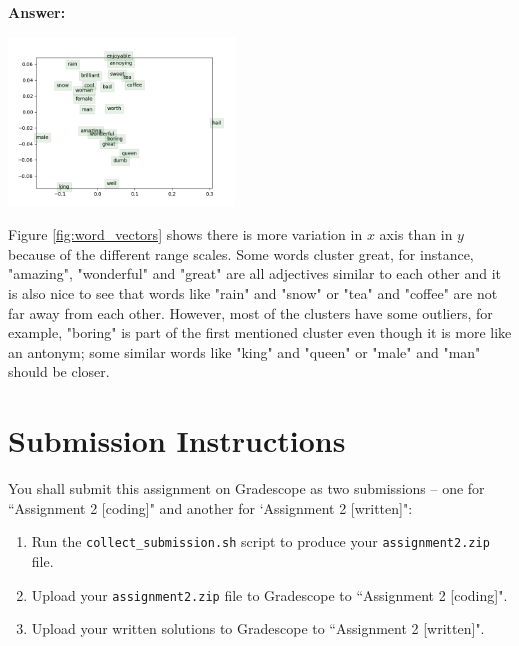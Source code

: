 \documentclass{article}
\newenvironment{answer}{
    {\bf Answer:} \sf \begingroup\color{red}
}{\endgroup}%
\begin{document}
\begin{enumerate}[label=(\alph*)]
\begin{shaded}
\begin{answer}

\begin{minipage}[h]{\linewidth}
    \begin{center}
   \vspace{-2ex}
   \includegraphics[width=0.45\textwidth]{word_vectors.png}
   \label{fig:word_vectors}
   \end{center}
\end{minipage} \color{red} {Figure \ref{fig:word_vectors} shows there is more variation in $x$ axis than in $y$ because of the different range scales. Some words cluster great, for instance, "amazing", "wonderful" and "great" are all adjectives similar to each other and it is also nice to see that words like "rain" and "snow" or "tea" and "coffee" are not far away from each other. However, most of the clusters have some outliers, for example, "boring" is part of the first mentioned cluster even though it is more like an antonym; some similar words like "king" and "queen" or "male" and "man" should be closer.}

\end{answer}
\end{shaded}

\section{Submission Instructions}
You shall submit this assignment on Gradescope as two submissions -- one for ``Assignment 2 [coding]" and another for `Assignment 2 [written]":
\begin{enumerate}
    \item Run the \texttt{collect\_submission.sh} script to produce your \texttt{assignment2.zip} file.
    \item Upload your \texttt{assignment2.zip} file to Gradescope to ``Assignment 2 [coding]".
    \item Upload your written solutions to Gradescope to ``Assignment 2 [written]".
\end{enumerate}

\end{enumerate}
\end{document}
